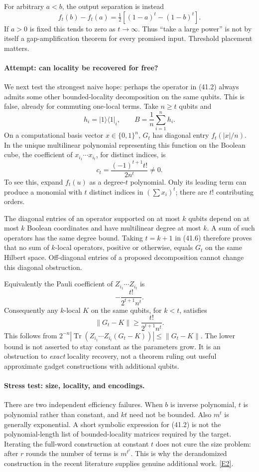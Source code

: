 \documentclass[11pt,a4paper]{article}
\newcommand{\eref}[2]{\hyperlink{extra:#1:#2}{[E#2]}}
\numberwithin{equation}{section}
\begin{document}
For arbitrary $a<b$, the output separation is instead
\[
 f_t(b)-f_t(a)=\tfrac12[(1-a)^t-(1-b)^t].            \tag{41.5}
\]
If $a>0$ is fixed this tends to zero as $t\to\infty$. Thus ``take a large
power'' is not by itself a gap-amplification theorem for every promised
input. Threshold placement matters.

\paragraph{Attempt: can locality be recovered for free?}
We next test the strongest naive hope: perhaps the operator in (41.2)
always admits some other bounded-locality decomposition on the same
qubits. This is false, already for commuting one-local terms.
Take $n\ge t$ qubits and
\[
 h_i=|1\rangle\langle1|_i,\qquad B=\frac1n\sum_{i=1}^n h_i.
\]
On a computational basis vector $x\in\{0,1\}^n$, $G_t$ has diagonal
entry $f_t(|x|/n)$. In the unique multilinear polynomial representing
this function on the Boolean cube, the coefficient of
$x_{i_1}\cdots x_{i_t}$, for distinct indices, is
\[
 c_t=\frac{(-1)^{t+1}t!}{2n^t}\ne0.               \tag{41.6}
\]
To see this, expand $f_t(u)$ as a degree-$t$ polynomial. Only its leading
term can produce a monomial with $t$ distinct indices in
$(\sum x_i)^t$; there are $t!$ contributing orders.

The diagonal entries of an operator supported on at most $k$ qubits
depend on at most $k$ Boolean coordinates and have multilinear degree at
most $k$. A sum of such operators has the same degree bound. Taking
$t=k+1$ in (41.6) therefore proves that no sum of $k$-local operators,
positive or otherwise, equals $G_t$ on the same Hilbert space.
Off-diagonal entries of a proposed decomposition cannot change this
diagonal obstruction.

Equivalently the Pauli coefficient of
$Z_{i_1}\cdots Z_{i_t}$ is
\[
 -\frac{t!}{2^{t+1}n^t}.
 \tag{41.7}
\]
Consequently any $k$-local $K$ on the same qubits, for $k<t$, satisfies
\[
 \|G_t-K\|\ge \frac{t!}{2^{t+1}n^t}.
\]
This follows from
$2^{-n}|\operatorname{Tr}(Z_{i_1}\cdots Z_{i_t}(G_t-K))|
\le\|G_t-K\|$. The lower bound is not asserted to stay constant as the
parameters grow. It is an obstruction to \emph{exact} locality recovery,
not a theorem ruling out useful approximate gadget constructions with
additional qubits.

\paragraph{Stress test: size, locality, and encodings.}
There are two independent efficiency failures. When $b$ is inverse
polynomial, $t$ is polynomial rather than constant, and $kt$ need not be
bounded. Also $m^t$ is generally exponential. A short symbolic expression
for (41.2) is not the polynomial-length list of bounded-locality matrices
required by the target. Iterating the full-word construction at constant
$t$ does not cure the size problem: after $r$ rounds the number of terms
is $m^{t^r}$. This is why the derandomized construction in the recent
literature supplies genuine additional work. \eref{30006691}{2}.
\end{document}
